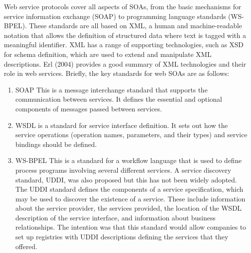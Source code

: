\documentclass[12pt,a4paper,final,twoside,onecolumn,titlepage]{book}
\begin{document}
Web service protocols cover all aspects of \gls{SOA}s, from the basic mechanisms for service information exchange (\gls{SOAP}) to programming language standards (WS-BPEL). These standards are all based on \gls{XML}, a human and machine-readable notation that allows the definition of structured data where text is tagged with a meaningful identifier. \gls{XML} has a range of supporting technologies, such as XSD for schema definition, which are used to extend and manipulate \gls{XML} descriptions. Erl (2004) provides a good summary of \gls{XML} technologies and their role in web services.
Briefly, the key standards for web \gls{SOA}s are as follows:
\begin{enumerate}
\item \gls{SOAP} This is a message interchange standard that supports the communication between services. It defines the essential and optional components of messages passed between services.
\item \gls{WSDL} is a standard for service interface definition. It sets out how the service operations (operation names, parameters, and their types) and service bindings should be defined.
\item WS-BPEL This is a standard for a workflow language that is used to define process programs involving several different services.
A service discovery standard, \gls{UDDI}, was also proposed but this has not been widely adopted. The \gls{UDDI}  standard defines the components of a service specification, which may be used to discover the existence of a service. These include information about the service provider, the services provided, the location of the \gls{WSDL} description of the service interface, and information about business relationships. The intention was that this standard would allow companies to set up registries with \gls{UDDI} descriptions defining the services that they offered.
\end{enumerate}
\end{document}
